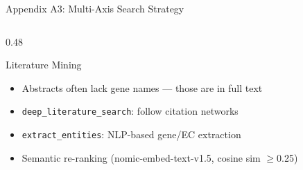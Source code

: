 \documentclass[aspectratio=169, 11pt]{beamer}
\begin{document}
\begin{frame}{Appendix A3: Multi-Axis Search Strategy}
\begin{columns}[T]
\begin{column}{0.48\textwidth}
\begin{block}{\small Literature Mining}
\vspace{-2pt}
\begin{itemize}\scriptsize
\setlength\itemsep{0pt}
\item Abstracts often lack gene names --- those are in full text
\item \texttt{deep\_literature\_search}: follow citation networks
\item \texttt{extract\_entities}: NLP-based gene/EC extraction
\item Semantic re-ranking (nomic-embed-text-v1.5, cosine sim $\geq$0.25)
\end{itemize}
\end{block}
\end{column}
\end{columns}
\end{frame}
\end{document}
